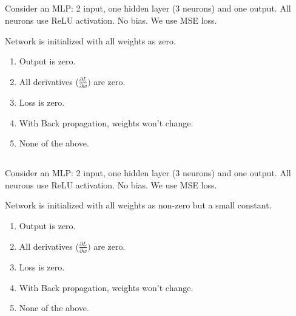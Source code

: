 \begin{frame}
\section{}
Consider an MLP: 2 input, one hidden  layer (3 neurons) and one output. All neurons use ReLU activation. No bias. We use MSE loss.

Network is initialized with all weights as zero.
\begin{enumerate}[label=(\Alph*)]
\item Output is zero.   %
\item All derivatives ($\frac{\partial L}{\partial w})$ are zero.   %
\item Loss is zero.
\item With Back propagation, weights  won't change.   %
\item  None of the above.  %
\end{enumerate}
\end{frame}

\begin{frame}
\section{}
Consider an MLP: 2 input, one hidden  layer (3 neurons) and one output. All neurons use ReLU activation. No bias. We use MSE loss.

Network is initialized with all weights as non-zero but a small  constant.

\begin{enumerate}[label=(\Alph*)]
\item Output is zero.
\item All derivatives ($\frac{\partial L}{\partial w})$ are zero.
\item Loss is zero.
\item With Back propagation, weights  won't change.
\item  None of the above.   %
\end{enumerate}
\end{frame}

